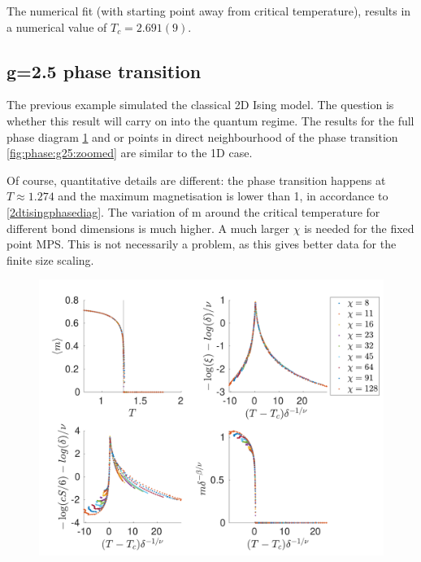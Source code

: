 The numerical fit (with starting point away from  critical temperature), results in a numerical value of $T_c = 2.691(9) $.

\subsection{g=2.5 phase transition}

The previous example simulated the classical 2D Ising model. The question is whether this result will carry on into the quantum regime. The results for the full phase diagram \cref{fig:phase:g25:full} and or points in direct neighbourhood of the phase transition \cref{fig:phase:g25:zoomed} are similar to the 1D case.

Of course, quantitative details are different: the phase transition happens at $T\approx 1.274$ and the maximum magnetisation is lower than 1, in accordance to \cref{2dtisingphasediag}. The variation of m around the critical temperature for different bond dimensions is much higher. A much larger $\chi$ is needed for the fixed point MPS. This is not necessarily a problem, as this gives better data for the finite size scaling.

\begin{figure}
    \center
    \includegraphics[width=\textwidth]{Figuren/phasediag/g25/Full.pdf}
    \caption{  }
    \label{fig:phase:g25:full}
\end{figure}

